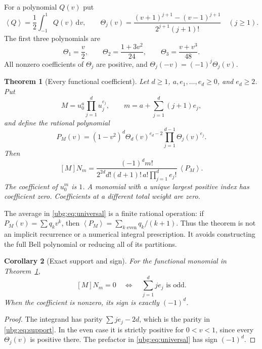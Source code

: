 \documentclass[11pt,letterpaper]{article}
\numberwithin{equation}{section}
\newtheorem{theorem}{Theorem}[section]
\newtheorem{corollary}[theorem]{Corollary}
\theoremstyle{definition}\newtheorem{definition}[theorem]{Definition}
\theoremstyle{remark}\newtheorem{remark}[theorem]{Remark}
\newcommand{\dd}{\,\mathrm d}\newcommand{\ii}{\mathrm i}
\newcommand{\av}[1]{\left\langle #1\right\rangle}
\begin{document}
For a polynomial $Q(v)$ put
\begin{equation}\label{ubg:eq:average}
 \av{Q}=\frac12\int_{-1}^1Q(v)\dd v,
 \qquad
 \Theta_j(v)=\frac{(v+1)^{j+1}-(v-1)^{j+1}}
                 {2^{j+1}(j+1)!}\quad(j\ge1).
\end{equation}
The first three polynomials are
\begin{equation}\label{ubg:eq:first-theta}
 \Theta_1=\frac v2,\qquad
 \Theta_2=\frac{1+3v^2}{24},\qquad
 \Theta_3=\frac{v+v^3}{48}.
\end{equation}
All nonzero coefficients of $\Theta_j$ are positive, and
$\Theta_j(-v)=(-1)^j\Theta_j(v)$.

\begin{theorem}[Every functional coefficient]\label{ubg:thm:universal}
Let $d\ge1$, $a,e_1,\ldots,e_d\ge0$, and $e_d\ge2$. Put
\[
 M=u_0^a\prod_{j=1}^d u_j^{e_j},\qquad
 m=a+\sum_{j=1}^d(j+1)e_j,
\]
and define the rational polynomial
\begin{equation}\label{ubg:eq:weight-polynomial}
 P_M(v)=(1-v^2)^d\Theta_d(v)^{e_d-2}
                      \prod_{j=1}^{d-1}\Theta_j(v)^{e_j}.
\end{equation}
Then
\begin{equation}\label{ubg:eq:universal}
 \boxed{\displaystyle
 [M]N_m=
 \frac{(-1)^d m!}
 {2^{2d}d!(d+1)!\,a!\prod_{j=1}^d e_j!}\,\av{P_M}.}
\end{equation}
The coefficient of $u_0^m$ is $1$. A monomial with a unique largest
positive index has coefficient zero. Coefficients at a different total
weight are zero.
\end{theorem}

The average in \eqref{ubg:eq:universal} is a finite rational operation:
if $P_M(v)=\sum q_kv^k$, then
$\av{P_M}=\sum_{k\text{ even}}q_k/(k+1)$. Thus the theorem is not an
implicit recurrence or a numerical integral prescription. It avoids
constructing the full Bell polynomial or reducing all of its partitions.

\begin{corollary}[Exact support and sign]\label{ubg:cor:sign}
For the functional monomial in Theorem~\ref{ubg:thm:universal},
\begin{equation}\label{ubg:eq:support}
 [M]N_m=0\quad\Longleftrightarrow\quad
                      \sum_{j=1}^d je_j\text{ is odd}.
\end{equation}
When the coefficient is nonzero, its sign is exactly $(-1)^d$.
\end{corollary}
\begin{proof}
The integrand has parity $\sum je_j-2d$, which is the parity in
\eqref{ubg:eq:support}. In the even case it is strictly positive for
$0<v<1$, since every $\Theta_j(v)$ is positive there. The prefactor in
\eqref{ubg:eq:universal} has sign $(-1)^d$.
\end{proof}
\end{document}
